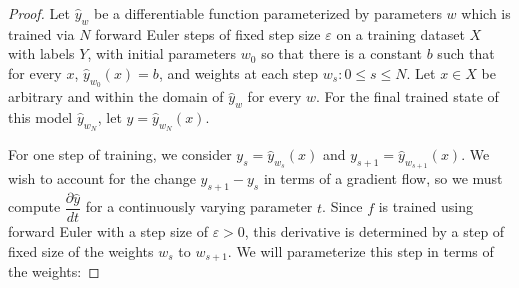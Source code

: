 \ekr*
\begin{proof}

Let $\hat y_{w}$ be a differentiable function parameterized by parameters $w$ which is trained via $N$ forward Euler steps of fixed step size $\varepsilon$ on a training dataset $X$ with labels $ Y$, with initial parameters $w_0$ so that there is a constant $b$ such that for every $x$, $\hat y_{w_0}(x) = b$, and weights at each step ${w_s : 0 \leq s \leq N}$. Let $x \in X$ be arbitrary and within the domain of $\hat y_w$ for every $w$. For the final trained state of this model $\hat y_{w_N}$, let $y = \hat y_{w_N}(x)$. 

For one step of training, we consider $y_s  = \hat y_{w_s}(x)$ and $y_{s+1} = \hat y_{w_{s+1}}(x)$. We wish to account for the change $y_{s+1} - y_s$ in terms of a gradient flow, so we must compute $\dfrac{\partial \hat y}{dt}$ for a continuously varying parameter $t$. Since $f$ is trained using forward Euler with a step size of $\varepsilon > 0$, this derivative is determined by a step of fixed size of the weights $w_s$ to $w_{s+1}$. We will parameterize this step in terms of the weights:


\end{proof}
